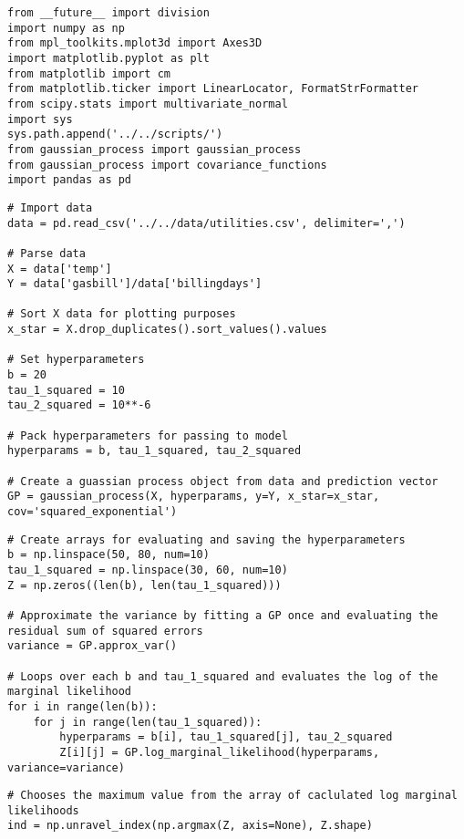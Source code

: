 \documentclass[10pt]{article}
\begin{document}
\begin{enumerate}[label=(\Alph*)]
        \begin{lstlisting}
from __future__ import division
import numpy as np 
from mpl_toolkits.mplot3d import Axes3D
import matplotlib.pyplot as plt
from matplotlib import cm
from matplotlib.ticker import LinearLocator, FormatStrFormatter
from scipy.stats import multivariate_normal
import sys
sys.path.append('../../scripts/')
from gaussian_process import gaussian_process
from gaussian_process import covariance_functions
import pandas as pd
        \end{lstlisting}

        \begin{lstlisting}
# Import data
data = pd.read_csv('../../data/utilities.csv', delimiter=',')

# Parse data
X = data['temp']
Y = data['gasbill']/data['billingdays']

# Sort X data for plotting purposes
x_star = X.drop_duplicates().sort_values().values

# Set hyperparameters
b = 20
tau_1_squared = 10
tau_2_squared = 10**-6

# Pack hyperparameters for passing to model
hyperparams = b, tau_1_squared, tau_2_squared

# Create a guassian process object from data and prediction vector
GP = gaussian_process(X, hyperparams, y=Y, x_star=x_star, cov='squared_exponential')
        \end{lstlisting}

        \begin{lstlisting}
# Create arrays for evaluating and saving the hyperparameters
b = np.linspace(50, 80, num=10)
tau_1_squared = np.linspace(30, 60, num=10)
Z = np.zeros((len(b), len(tau_1_squared)))

# Approximate the variance by fitting a GP once and evaluating the residual sum of squared errors
variance = GP.approx_var()

# Loops over each b and tau_1_squared and evaluates the log of the marginal likelihood
for i in range(len(b)):
    for j in range(len(tau_1_squared)):
        hyperparams = b[i], tau_1_squared[j], tau_2_squared
        Z[i][j] = GP.log_marginal_likelihood(hyperparams, variance=variance)
        \end{lstlisting}

        \begin{lstlisting}
# Chooses the maximum value from the array of caclulated log marginal likelihoods
ind = np.unravel_index(np.argmax(Z, axis=None), Z.shape)


\end{lstlisting}
\end{enumerate}
\end{document}
